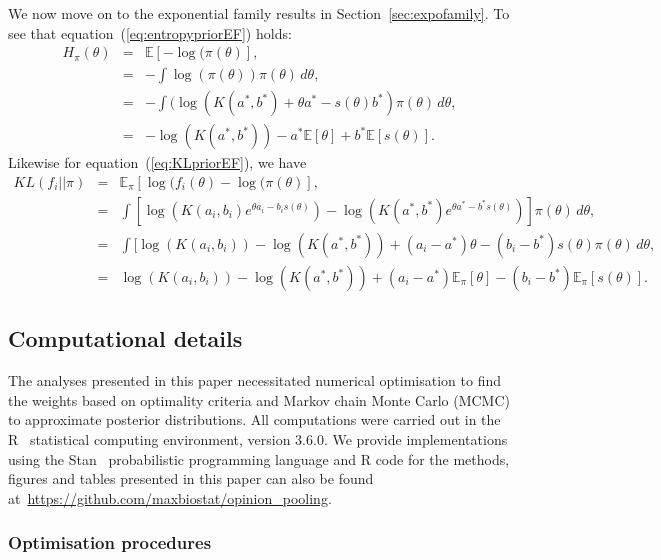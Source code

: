 \documentclass[12pt]{article}
\begin{document}
We now move on to the exponential family results in Section~\ref{sec:expofamily}.
To see that equation~(\ref{eq:entropypriorEF}) holds:
\begin{eqnarray*} 
H_\pi(\theta) & = & \mathbb{E}[-\log(\pi(\theta)], \\
              & = & - \int \log(\pi(\theta)) \pi(\theta) \, d\theta, \\
              & = & - \int (\log(K(a^*, b^*) + \theta a^* - s(\theta) b^*) \pi(\theta) \, d\theta, \\
              & = & - \log(K(a^*, b^*)) - a^*  \mathbb{E}[\theta] +  b^*  \mathbb{E}[s(\theta)].
\end{eqnarray*}
Likewise for equation~(\ref{eq:KLpriorEF}), we have 
\begin{eqnarray*} 
KL(f_i || \pi) & = & \mathbb{E}_\pi[\log(f_i(\theta)-\log(\pi(\theta)], \\
              & = & \int [\log( K(a_i,b_i) e^{\theta a_i - b_i s(\theta)}) - \log(K(a^*,b^*) e^{\theta a^* - b^* s(\theta)}) ] \pi(\theta) \, d\theta, \\
              & = & \int [\log( K(a_i,b_i)) - \log(K(a^*,b^*)) + (a_i - a^*) \theta  - (b_i - b^*) s(\theta) \pi(\theta) \, d\theta, \\
              & = & \log( K(a_i,b_i)) - \log(K(a^*,b^*)) + (a_i - a^*) \mathbb{E}_\pi[\theta] - (b_i - b^*) \mathbb{E}_\pi[s(\theta)]. 
\end{eqnarray*}

\newpage
\subsection{Computational details}
\label{sec:appendix_compdetails}

The analyses presented in this paper necessitated numerical optimisation to find the weights based on optimality criteria and Markov chain Monte Carlo (MCMC) to approximate posterior distributions.
All computations were carried out in the R~\parencite{R2019} statistical computing environment, version 3.6.0. 
We provide implementations using the Stan~\parencite{Carpenter2017} probabilistic programming language and R code for the methods, figures and tables presented in this paper can also be found at~\url{https://github.com/maxbiostat/opinion_pooling}.

\subsubsection{Optimisation procedures}
\label{sec:computation_opt}
\end{document}
